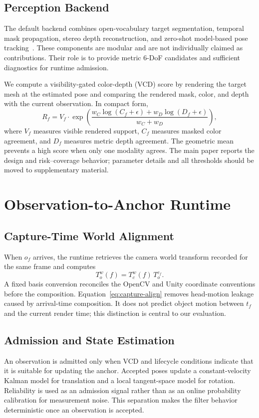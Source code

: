 \documentclass[review]{vgtc}
\begin{document}
\subsection{Perception Backend}
The default backend combines open-vocabulary target segmentation, temporal mask propagation, stereo depth reconstruction, and zero-shot model-based pose tracking~\cite{yoloe2025,cutie2024,foundationstereo2025,foundationpose2023}. These components are modular and are not individually claimed as contributions. Their role is to provide metric 6-DoF candidates and sufficient diagnostics for runtime admission.

We compute a visibility-gated color-depth (VCD) score by rendering the target mesh at the estimated pose and comparing the rendered mask, color, and depth with the current observation. In compact form,
\begin{equation}
  R_f = V_f \cdot \exp\left(\frac{w_C\log(C_f+\epsilon)+w_D\log(D_f+\epsilon)}{w_C+w_D}\right),
\end{equation}
where $V_f$ measures visible rendered support, $C_f$ measures masked color agreement, and $D_f$ measures metric depth agreement. The geometric mean prevents a high score when only one modality agrees. The main paper reports the design and risk--coverage behavior; parameter details and all thresholds should be moved to supplementary material.

\section{Observation-to-Anchor Runtime}
\subsection{Capture-Time World Alignment}
When $o_f$ arrives, the runtime retrieves the camera world transform recorded for the same frame and computes
\begin{equation}
  T_o^w(f) = T_c^w(f)\, T_o^{c_f}.
  \label{eq:capture-align}
\end{equation}
A fixed basis conversion reconciles the OpenCV and Unity coordinate conventions before the composition. Equation~\ref{eq:capture-align} removes head-motion leakage caused by arrival-time composition. It does not predict object motion between $t_f$ and the current render time; this distinction is central to our evaluation.

\subsection{Admission and State Estimation}
An observation is admitted only when VCD and lifecycle conditions indicate that it is suitable for updating the anchor. Accepted poses update a constant-velocity Kalman model for translation and a local tangent-space model for rotation. Reliability is used as an admission signal rather than as an online probability calibration for measurement noise. This separation makes the filter behavior deterministic once an observation is accepted.
\end{document}

